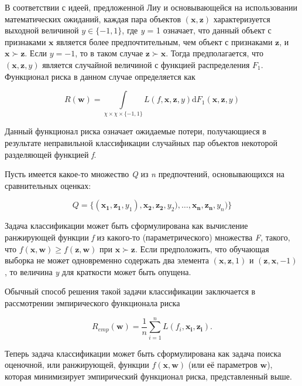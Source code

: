 \documentclass[12pt,a4paper,oneside]{article}
\begin{document}
\begin{multicols}{2}
\par
В соответствии с идеей, предложенной Лиу  и основывающейся на использовании математических ожиданий, каждая пара объектов \((\mathbf{x}, \mathbf{z})\) характеризуется выходной величиной \(y \in \{-1,1\}\), где \emph{y} = 1 означает, что данный объект с признаками \(\mathbf{x}\) является более предпочтительным, чем объект с признаками \(\mathbf{z}\), и \(\mathbf{x} \succ \mathbf{z}\). Если \(y = -1\), то в таком случае \(\mathbf{z} \succ \mathbf{x}\). Тогда предполагается, что \((\mathbf{x}, \mathbf{z}, y)\) является случайной величиной с функцией распределения \(F_1\). Функционал риска в данном случае определяется как

\[
R(\mathbf{w}) = \int \limits_{\chi \times \chi \times \{-1, 1\}} L(f, \mathbf{x}, \mathbf{z}, y) \mathrm{d} F_1(\mathbf{x}, \mathbf{z}, y)
\]

\par

Данный функционал риска означает ожидаемые потери, получающиеся в результате неправильной классификации случайных пар объектов некоторой разделяющей функцией \emph{f}. 

\par
Пусть имеется какое-то множество \emph{Q} из \emph{n} предпочтений, основывающихся на сравнительных оценках:

\[
Q = \{(\mathbf{x_1}, \mathbf{z_1}, y_1), \mathbf{x_2}, \mathbf{z_2}, y_2), \dots, \mathbf{x_n}, \mathbf{z_n}, y_n)\}
\]

\par
Задача классификации может быть сформулирована как вычисление ранжирующей функции \emph{f} из какого-то (параметрического) множества \emph{F}, такого, что \(f(\mathbf{x}, \mathbf{w}) \geq f(\mathbf{z}, \mathbf{w})\) при \(\mathbf{x} \succ \mathbf{z}\). 
Если предположить, что обучающая выборка не может одновременно содержать два элемента \((\mathbf{x}, \mathbf{z}, 1)\) и \((\mathbf{z}, \mathbf{x}, -1)\), то величина \emph{y} для краткости может быть опущена. 

\par
Обычный способ решения такой задачи классификации заключается в рассмотрении эмпирического функционала риска

\[
R_{emp}(\mathbf{w}) = \frac{1}{n} \sum \limits_{i=1}^n L(f_i, \mathbf{x_i}, \mathbf{z_i}).
\]

Теперь задача классификации может быть сформулирована как задача поиска оценочной, или ранжирующей, функции \(f(\mathbf{x}, \mathbf{w})\) (или её параметров \(\mathbf{w}\)), которая минимизирует эмпирический функционал риска, представленный выше. 


\end{multicols}
\end{document}
